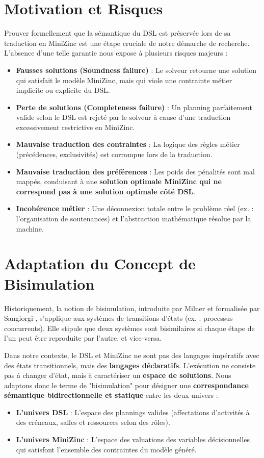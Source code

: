 \documentclass[12pt,a4paper]{article}
\begin{document}
\section{Motivation et Risques}
Prouver formellement que la sémantique du DSL est préservée lors de sa traduction en MiniZinc est une étape cruciale de notre démarche de recherche. L'absence d'une telle garantie nous expose à plusieurs risques majeurs :
\begin{itemize}
    \item \textbf{Fausses solutions (Soundness failure)} : Le solveur retourne une solution qui satisfait le modèle MiniZinc, mais qui viole une contrainte métier implicite ou explicite du DSL.
    \item \textbf{Perte de solutions (Completeness failure)} : Un planning parfaitement valide selon le DSL est rejeté par le solveur à cause d'une traduction excessivement restrictive en MiniZinc.
    \item \textbf{Mauvaise traduction des contraintes} : La logique des règles métier (précédences, exclusivités) est corrompue lors de la traduction.
    \item \textbf{Mauvaise traduction des préférences} : Les poids des pénalités sont mal mappés, conduisant à une \textbf{solution optimale MiniZinc qui ne correspond pas à une solution optimale côté DSL}.
    \item \textbf{Incohérence métier} : Une déconnexion totale entre le problème réel (ex. : l'organisation de soutenances) et l'abstraction mathématique résolue par la machine.
\end{itemize}

\section{Adaptation du Concept de Bisimulation}
Historiquement, la notion de bisimulation, introduite par Milner et formalisée par Sangiorgi \cite{milner1989communication, sangiorgi2011introduction}, s'applique aux systèmes de transitions d'états (ex. : processus concurrents). Elle stipule que deux systèmes sont bisimilaires si chaque étape de l'un peut être reproduite par l'autre, et vice-versa.

Dans notre contexte, le DSL et MiniZinc ne sont pas des langages impératifs avec des états transitionnels, mais des \textbf{langages déclaratifs}. L'exécution ne consiste pas à changer d'état, mais à caractériser un \textbf{espace de solutions}. Nous adaptons donc le terme de "bisimulation" pour désigner une \textbf{correspondance sémantique bidirectionnelle et statique} entre les deux univers :
\begin{itemize}
    \item \textbf{L'univers DSL} : L'espace des plannings valides (affectations d'activités à des créneaux, salles et ressources selon des rôles).
    \item \textbf{L'univers MiniZinc} : L'espace des valuations des variables décisionnelles qui satisfont l'ensemble des contraintes du modèle généré.
\end{itemize}
\end{document}
